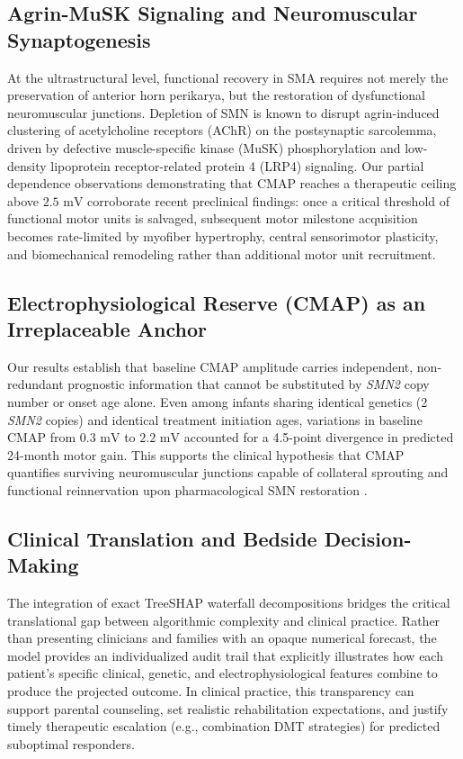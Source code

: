 \documentclass[journal]{IEEEtran}
\begin{document}
\subsection{Agrin-MuSK Signaling and Neuromuscular Synaptogenesis}
At the ultrastructural level, functional recovery in SMA requires not merely the preservation of anterior horn perikarya, but the restoration of dysfunctional neuromuscular junctions. Depletion of SMN is known to disrupt agrin-induced clustering of acetylcholine receptors (AChR) on the postsynaptic sarcolemma, driven by defective muscle-specific kinase (MuSK) phosphorylation and low-density lipoprotein receptor-related protein 4 (LRP4) signaling. Our partial dependence observations demonstrating that CMAP reaches a therapeutic ceiling above $2.5\text{ mV}$ corroborate recent preclinical findings: once a critical threshold of functional motor units is salvaged, subsequent motor milestone acquisition becomes rate-limited by myofiber hypertrophy, central sensorimotor plasticity, and biomechanical remodeling rather than additional motor unit recruitment.

\subsection{Electrophysiological Reserve (CMAP) as an Irreplaceable Anchor}
Our results establish that baseline CMAP amplitude carries independent, non-redundant prognostic information that cannot be substituted by \textit{SMN2} copy number or onset age alone. Even among infants sharing identical genetics (2 \textit{SMN2} copies) and identical treatment initiation ages, variations in baseline CMAP from $0.3\text{ mV}$ to $2.2\text{ mV}$ accounted for a 4.5-point divergence in predicted 24-month motor gain. This supports the clinical hypothesis that CMAP quantifies surviving neuromuscular junctions capable of collateral sprouting and functional reinnervation upon pharmacological SMN restoration \cite{devivo2024compound}.

\subsection{Clinical Translation and Bedside Decision-Making}
The integration of exact TreeSHAP waterfall decompositions bridges the critical translational gap between algorithmic complexity and clinical practice. Rather than presenting clinicians and families with an opaque numerical forecast, the model provides an individualized audit trail that explicitly illustrates how each patient's specific clinical, genetic, and electrophysiological features combine to produce the projected outcome. In clinical practice, this transparency can support parental counseling, set realistic rehabilitation expectations, and justify timely therapeutic escalation (e.g., combination DMT strategies) for predicted suboptimal responders.
\end{document}
